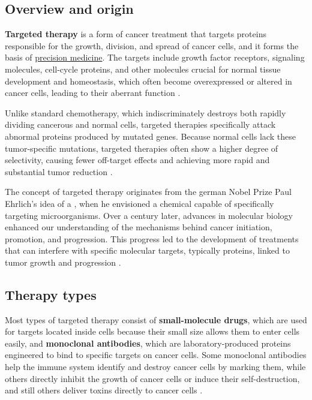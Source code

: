 \subsection{Overview and origin}

\textbf{Targeted therapy} is a form of cancer treatment that targets proteins responsible for the growth, division, and spread of cancer cells, and it forms the basis of \href{https://en.wikipedia.org/wiki/Personalized_medicine}{precision medicine}. The targets include growth factor receptors, signaling molecules, cell-cycle proteins, and other molecules crucial for normal tissue development and homeostasis, which often become overexpressed or altered in cancer cells, leading to their aberrant function \cite{se_tt}.

Unlike standard chemotherapy, which indiscriminately destroys both rapidly dividing cancerous and normal cells, targeted therapies specifically attack abnormal proteins produced by mutated genes. Because normal cells lack these tumor-specific mutations, targeted therapies often show a higher degree of selectivity, causing fewer off-target effects and achieving more rapid and substantial tumor reduction \cite{jci}.

The concept of targeted therapy originates from the german Nobel Prize Paul Ehrlich's idea of a  \cite{ehrlich}, when he envisioned a chemical capable of specifically targeting microorganisms. Over a century later, advances in molecular biology enhanced our understanding of the mechanisms behind cancer initiation, promotion, and progression. This progress led to the development of treatments that can interfere with specific molecular targets, typically proteins, linked to tumor growth and progression \cite{se_tt}.

\subsection{Therapy types}

Most types of targeted therapy consist of \textbf{small-molecule drugs}, which are used for targets located inside cells because their small size allows them to enter cells easily, and \textbf{monoclonal antibodies}, which are laboratory-produced proteins engineered to bind to specific targets on cancer cells. Some monoclonal antibodies help the immune system identify and destroy cancer cells by marking them, while others directly inhibit the growth of cancer cells or induce their self-destruction, and still others deliver toxins directly to cancer cells \cite{target_therapy1}.

